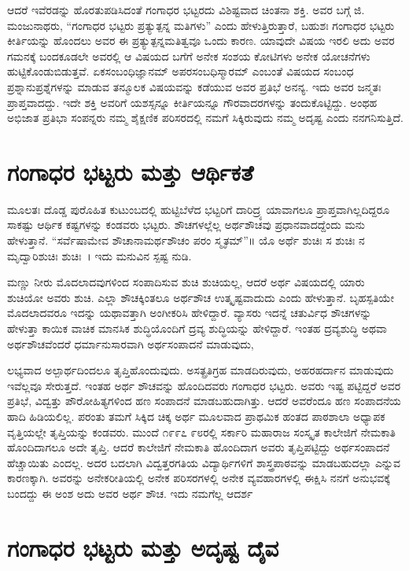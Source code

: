{ಆದರೆ ಇವೆರಡನ್ನು ಹೊರತುಪಡಿಸಿದಂತೆ ಗಂಗಾಧರ ಭಟ್ಟರದು ವಿಶಿಷ್ಟವಾದ ಚಿಂತನಾ ಶಕ್ತಿ. ಅವರ ಬಗ್ಗೆ ಜಿ. ಮಂಜುನಾಥರು, “ಗಂಗಾಧರ ಭಟ್ಟರು ಪ್ರತ್ಯುತ್ಪನ್ನ ಮತಿಗಳು” ಎಂದು ಹೇಳುತ್ತಿರುತ್ತಾರೆ, ಬಹುಶಃ ಗಂಗಾಧರ ಭಟ್ಟರು ಕೀರ್ತಿಯನ್ನು ಹೊಂದಲು ಅವರ ಈ ಪ್ರತ್ಯುತ್ಪನ್ನಮತಿತ್ವವೂ ಒಂದು ಕಾರಣ. ಯಾವುದೇ ವಿಷಯ ಇರಲಿ ಅದು ಅವರ ಗಮನಕ್ಕೆ ಬಂದಕೂಡಲೇ ಅವರಲ್ಲಿ ಆ ವಿಷಯದ ಬಗೆಗೆ ಅನೇಕ ಸಂಶಯ ಕೋಟಿಗಳು ಅನೇಕ ಯೋಚನೆಗಳು ಹುಟ್ಟಿಕೊಂಡುಬಿಡುತ್ತವೆ. ಏಕಸಂಬಂಧಿ\-ಜ್ಞಾನಮ್ ಅಪರಸಂಬಧಿಸ್ಮಾರಮ್ ಎಂಬಂತೆ ವಿಷಯದ ಸಂಬಂಧ ಪ್ರಶ್ನಾನುಪ್ರಶ್ನೆ\-ಗಳನ್ನು ಮಾಡುವ ತನ್ಮೂಲಕ ವಿಷಯವನ್ನು ಕಡೆಯುವ ಅವರ ಪ್ರತಿಭೆ ಅನನ್ಯ. ಇದು ಅವರ ಜನ್ಮತಃ ಪ್ರಾಪ್ತವಾದದ್ದು. ಇದೇ ಶಕ್ತಿ ಅವರಿಗೆ ಯಶಸ್ಸನ್ನೂ ಕೀರ್ತಿಯನ್ನೂ ಗೌರವಾದರಗಳನ್ನು ತಂದುಕೊಟ್ಟಿದ್ದು. ಅಂಥಹ ಅಭಿಜಾತ ಪ್ರತಿಭಾ ಸಂಪನ್ನರು ನಮ್ಮ ಶೈಕ್ಷಣಿಕ ಪರಿಸರದಲ್ಲಿ ನಮಗೆ ಸಿಕ್ಕಿರುವುದು ನಮ್ಮ ಅದೃಷ್ಟ ಎಂದು ನನಗನಿಸುತ್ತಿದೆ.

\section*{ಗಂಗಾಧರ ಭಟ್ಟರು ಮತ್ತು ಆರ್ಥಿಕತೆ}

ಮೂಲತಃ ದೊಡ್ಡ ಪುರೊಹಿತ ಕುಟುಂಬದಲ್ಲಿ ಹುಟ್ಟಿಬೆಳೆದ ಭಟ್ಟರಿಗೆ ದಾರಿದ್ರ್ಯ ಯಾವಾಗಲೂ ಪ್ರಾಪ್ತವಾಗಿಲ್ಲದಿದ್ದರೂ ಸಾಕಷ್ಟು ಆರ್ಥಿಕ ಕಷ್ಟಗಳನ್ನು ಕಂಡವರು ಭಟ್ಟರು. ಶೌಚಗಳಲ್ಲೆಲ್ಲ ಅರ್ಥಶೌಚವು ಪ್ರಧಾನವಾದದ್ದೆಂದು ಮನು ಹೇಳುತ್ತಾನೆ. “ಸರ್ವೆಷಾಮೇವ ಶೌಚಾನಾಮರ್ಥಶೌಚಂ ಪರಂ ಸ್ಮೃತಮ್”॥ ಯೊ ಅರ್ಥೆ ಶುಚಿಃ ಸ ಶುಚಿಃ ನ ಮೃದ್ವಾರಿಶುಚಿಃ ಶುಚಿಃ~। ಇದು ಮನುವಿನ ಸ್ಪಷ್ಟ ನುಡಿ. 

ಮಣ್ಣು ನೀರು ಮೊದಲಾದವುಗಳಿಂದ ಸಂಪಾದಿಸುವ ಶುಚಿ ಶುಚಿಯಲ್ಲ, ಆದರೆ ಅರ್ಥ ವಿಷಯದಲ್ಲಿ ಯಾರು ಶುಚಿಯೋ ಅವರು ಶುಚಿ. ಎಲ್ಲಾ ಶೌಚಕ್ಕಿಂತಲೂ ಅರ್ಥಶೌಚ ಉತ್ಕೃಷ್ಟವಾದುದು ಎಂದು ಹೇಳುತ್ತಾನೆ. ಬೃಹಸ್ಪತಿಯೇ ಮೊದಲಾದವರೂ ಇದನ್ನು ಯಥಾವತ್ತಾಗಿ ಅಂಗೀಕರಿಸಿ ಹೇಳಿದ್ದಾರೆ. ವ್ಯಾಸರು ಇದನ್ನೆ ಚತುರ್ವಿಧ ಶೌಚಗಳನ್ನು ಹೇಳುತ್ತಾ ಕಾಯಿಕ ವಾಚಿಕ ಮಾನಸಿಕ ಶುದ್ಧಿಯೊಂದಿಗೆ ದ್ರವ್ಯ ಶುದ್ಧಿಯನ್ನು ಹೇಳಿದ್ದಾರೆ. ಇಂತಹ ದ್ರವ್ಯಶುದ್ಧಿ ಅಥವಾ ಅರ್ಥಶೌಚವೆಂದರೆ ಧರ್ಮಾನುಸಾರವಾಗಿ ಅರ್ಥಸಂಪಾದನೆ ಮಾಡುವುದು,

ಲಭ್ಯವಾದ ಅಲ್ಪಾರ್ಥದಿಂದಲೂ ತೃಪ್ತಿಹೊಂದುವುದು. ಅಸತ್ಪ್ರತಿಗ್ರಹ ಮಾಡದಿರುವುದು, ಅಹರಹರ್ದಾನ ಮಾಡುವುದು ಇವೆಲ್ಲವೂ ಸೇರುತ್ತದೆ. ಇಂತಹ ಅರ್ಥ ಶೌಚವನ್ನು ಹೊಂದಿದವರು ಗಂಗಾಧರ ಭಟ್ಟರು. ಅವರು ಇಷ್ಟ ಪಟ್ಟಿದ್ದರೆ ಅವರ ಪ್ರತಿಭೆ, ವಿದ್ವತ್ತು ಪೌರೋಹಿತ್ಯಗಳಿಂದ ಹಣ ಸಂಪಾದನೆ ಮಾಡಬಹುದಾಗಿತ್ತು. ಆದರೆ ಅವರೆಂದೂ ಹಣ ಸಂಪಾದನೆಯ ಹಾದಿ ಹಿಡಿಯಲಿಲ್ಲ. ಪರಂತು ತಮಗೆ ಸಿಕ್ಕಿದ ಚಿಕ್ಕ ಅರ್ಥ ಮೂಲವಾದ ಪ್ರಾಥಮಿಕ ಹಂತದ ಪಾಠಶಾಲಾ ಅಧ್ಯಾಪಕ ವೃತ್ತಿಯಲ್ಲೇ ತೃಪ್ತಿಯನ್ನು ಕಂಡವರು. ಮುಂದೆ ೧೯೯೭  \enginline{-}  ೯೮ರಲ್ಲಿ ಸರ್ಕಾರಿ ಮಹಾರಾಜ ಸಂಸ್ಕೃತ ಕಾಲೇಜಿಗೆ ನೇಮಕಾತಿ ಹೊಂದಿದಾಗಲೂ ಅದೇ ತೃಪ್ತಿ. ಆದರೆ ಕಾಲೇಜಿಗೆ ನೇಮಕಾತಿ ಹೊಂದಿದಾಗ ಅವರು ತೃಪ್ತಿಪಟ್ಟಿದ್ದು ಅರ್ಥಸಂಪಾದನೆ ಹೆಚ್ಚಾಯಿತು ಎಂದಲ್ಲ. ಅದರ ಬದಲಾಗಿ ವಿದ್ವತ್ತರಗತಿಯ ವಿದ್ಯಾರ್ಥಿಗಳಿಗೆ ಶಾಸ್ತ್ರಪಾಠವನ್ನು ಮಾಡಬಹುದಲ್ಲಾ ಎನ್ನುವ ಕಾರಣಕ್ಕಾಗಿ. ಅವರನ್ನು ಅನೇಕರೀತಿಯಲ್ಲಿ ಅನೇಕ ಪರಿಸರಗಳಲ್ಲಿ ಅನೇಕ ವ್ಯವಹಾರಗಳಲ್ಲಿ ಈಕ್ಷಿಸಿ ನನಗೆ ಅನುಭವಕ್ಕೆ ಬಂದದ್ದು ಈ ಅಂಶ   \enginline{-}   ಅದು ಅವರ ಅರ್ಥ ಶೌಚ. ಇದು ನಮಗೆಲ್ಲ ಆದರ್ಶ 

\section*{ಗಂಗಾಧರ ಭಟ್ಟರು ಮತ್ತು ಅದೃಷ್ಟ   \enginline{-}   ದೈವ}

}
